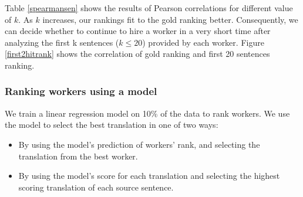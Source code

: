 \documentclass[11pt,letterpaper]{article}
\begin{document}
Table \ref{spearmansen} shows the results of Pearson correlations for different value of $k$. As $k$ increases, our rankings fit to the gold ranking better. Consequently, we can decide whether to continue to hire a worker in a very short time after analyzing the first k sentences ($k\le20$) provided by each worker. Figure \ref{first2hitrank} shows the correlation of gold ranking and first 20 sentences ranking. 




\subsubsection{Ranking workers using a model}
We train a linear regression model on 10\% of the data to rank workers.  We use the model to select the best translation in one of two ways:
\begin{itemize}
\item By using the model's prediction of workers' rank, and selecting the translation from the best worker.  
\item By using the model's score for each translation and selecting the highest scoring translation of each source sentence. 
\end{itemize}
\end{document}
